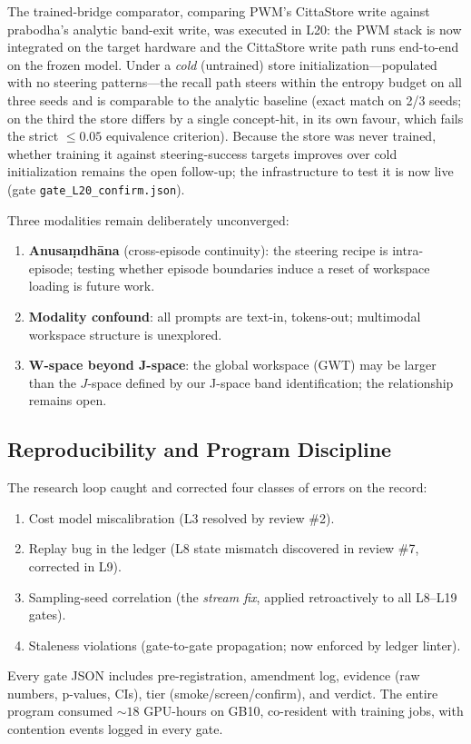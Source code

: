 The trained-bridge comparator, comparing PWM's CittaStore write against prabodha's analytic band-exit write,
was executed in L20: the PWM stack is now integrated on the target hardware and the CittaStore write path runs
end-to-end on the frozen model. Under a \emph{cold} (untrained) store initialization---populated with no steering
patterns---the recall path steers within the entropy budget on all three seeds and is comparable to the analytic
baseline (exact match on 2/3 seeds; on the third the store differs by a single concept-hit, in its own favour,
which fails the strict $\le0.05$ equivalence criterion). Because the store was never trained, whether training it
against steering-success targets improves over cold initialization remains the open follow-up; the infrastructure
to test it is now live (gate \texttt{gate\_L20\_confirm.json}).

Three modalities remain deliberately unconverged:
\begin{enumerate}
\item {\bf Anusa\d{m}dh\=ana} (cross-episode continuity): the steering recipe is intra-episode;
      testing whether episode boundaries induce a reset of workspace loading is future work.
\item {\bf Modality confound}: all prompts are text-in, tokens-out; multimodal workspace structure is unexplored.
\item {\bf W-space beyond J-space}: the global workspace (GWT) may be larger than the $J$-space defined by
      our J-space band identification; the relationship remains open.
\end{enumerate}

\subsection*{Reproducibility and Program Discipline}

The research loop caught and corrected four classes of errors on the record:
\begin{enumerate}
\item Cost model miscalibration (L3 resolved by review \#2).
\item Replay bug in the ledger (L8 state mismatch discovered in review \#7, corrected in L9).
\item Sampling-seed correlation (the \emph{stream fix}, applied retroactively to all L8--L19 gates).
\item Staleness violations (gate-to-gate propagation; now enforced by ledger linter).
\end{enumerate}

Every gate JSON includes pre-registration, amendment log, evidence (raw numbers, p-values, CIs), tier (smoke/screen/confirm),
and verdict. The entire program consumed $\sim 18$ GPU-hours on GB10, co-resident with training jobs,
with contention events logged in every gate.
